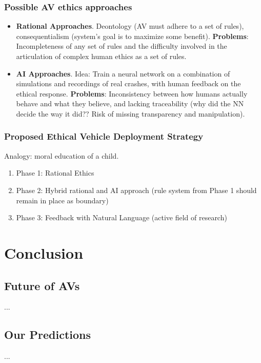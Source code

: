 \documentclass[11pt]{article}
\begin{document}
\subsubsection{Possible AV ethics approaches}

\begin{itemize}
\item \textbf{Rational Approaches}. Deontology (AV must adhere to a set of rules), consequentialism (system's goal is to maximize some benefit). \textbf{Problems}: Incompleteness of any set of rules and the difficulty involved in the articulation of complex human ethics as a set of rules.
\item \textbf{AI Approaches}. Idea: Train a neural network on a combination of simulations and recordings of real crashes, with human feedback on the ethical response. \textbf{Problems}: Inconsistency between how humans actually behave and what they believe, and lacking traceability (why did the NN decide the way it did?? Risk of missing transparency and manipulation).
\end{itemize}

\subsubsection{Proposed Ethical Vehicle Deployment Strategy}
Analogy: moral education of a child.
\begin{enumerate}
\item Phase 1: Rational Ethics
\item Phase 2: Hybrid rational and AI approach (rule system from Phase 1 should remain in place as boundary)
\item Phase 3: Feedback with Natural Language (active field of research)
\end{enumerate}

\section{Conclusion}
\subsection{Future of AVs}
...
\subsection{Our Predictions}
...

%

%


\end{document}
